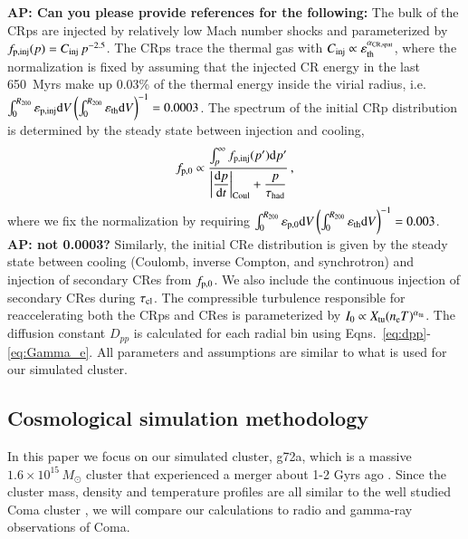 \documentclass[fleqn,usenatbib,useAMS]{mnras}
\newcommand{\eps}{\varepsilon}
\def\AP2#1{{\bf  AP2: #1}}
\def\AP#1{{\bf {\color{blue} AP: #1}}}
\begin{document}
\AP{Can you please provide references for the following:} The bulk of the
CRps are injected by relatively low Mach number shocks and
parameterized by $f_{\mathrm{p,inj}}(p) = C_{\mathrm{inj}}\,p^{-2.5}$. The
CRps trace the thermal gas with $C_\rmn{inj} \propto
\eps_\rmn{th}^{\alpha_\rmn{CR,spat}}$, where the normalization is
fixed by assuming that the injected CR energy in the last 650~Myrs
make up 0.03\% of the thermal energy inside the virial radius, i.e.
$\int_0^{R_{200}}\eps_\rmn{p,inj} \rmn{d}
V\left(\int_0^{R_{200}}\eps_\rmn{th} \rmn{d}V\right)^{-1} =
0.0003$. The spectrum of the initial CRp distribution is determined by
the steady state between injection and cooling,
\begin{equation}
 f_{\mathrm{p,0}} \propto \frac{\int_p^\infty f_{\mathrm{p,inj}}(p') 
{\mathrm{d}}p'}{\displaystyle\left|{{{\mathrm{d}}p}\over{{\mathrm{d}}t}}\right|_{\rm Coul}+\frac{p}{\tau_{\rm had}}}\,,
\end{equation}
where we fix the normalization by requiring
$\int_0^{R_{200}}\eps_\rmn{p,0}
\rmn{d}V\left(\int_0^{R_{200}}\eps_\rmn{th} \rmn{d}V\right)^{-1} =
0.003$. \AP{not 0.0003?} Similarly, the initial CRe distribution is
given by the steady state between cooling (Coulomb, inverse Compton,
and synchrotron) and injection of secondary CRes from $f_{\mathrm{p,0}}$. We
also include the continuous injection of secondary CRes during
$\tau_{\mathrm{cl}}$. The compressible turbulence responsible for
reaccelerating both the CRps and CRes is parameterized by $I_0 \propto
X_{\mathrm{tu}} (n_{{\mathrm{e}}} T)^{\alpha_{\mathrm{tu}}}$. The diffusion constant
$D_{pp}$ is calculated for each radial bin using
Eqns.~\ref{eq:dpp}-\ref{eq:Gamma_e}. All parameters and assumptions
are similar to what is used for our simulated cluster.

\subsection{Cosmological simulation methodology}
\label{sec:cosmo_sim}
In this paper we focus on our simulated cluster, g72a, which is a
massive $1.6\times10^{15}\,M_\odot$ cluster that experienced a merger
about 1-2 Gyrs ago \citep{2009MNRAS.399..497D}. Since the cluster
mass, density and temperature profiles are all similar to the well
studied Coma cluster \citep{2007MNRAS.378..385P,pinzke10}, we will
compare our calculations to radio and gamma-ray observations of Coma.
\end{document}
